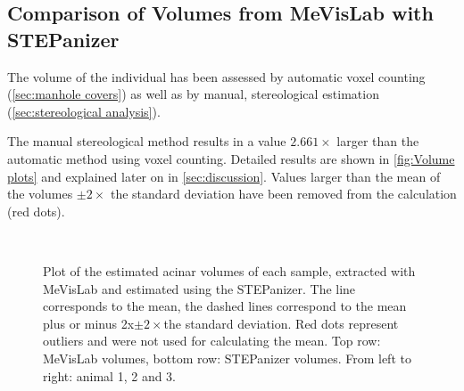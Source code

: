 \documentclass[a4paper,DIV=calc,abstract,english]{scrartcl}
\newcommand{\imsize}{\linewidth}
\newcommand{\biggerthan}{2} %
\newcommand{\difference}{2.661} %
\begin{document}
\subsection{Comparison of Volumes from MeVisLab with STEPanizer}
The volume of the individual has been assessed by automatic voxel counting (\autoref{sec:manhole covers}) as well as by manual, stereological estimation (\autoref{sec:stereological analysis}).

The manual stereological method results in a value \(\difference\times\) larger than the automatic method using voxel counting.
Detailed results are shown in \autoref{fig:Volume plots} and explained later on in \autoref{sec:discussion}.
Values larger than the mean of the volumes \(\pm\biggerthan\times\) the standard deviation have been removed from the calculation (red dots).

\renewcommand{\imsize}{0.35\textwidth}
\begin{figure}[htb]
	\centering
	\subfloat{
		}\hfill%
	\subfloat{
		
		}\hfill%
	\subfloat{
		
		}\\%
	\subfloat{
		
		}\hfill%
	\subfloat{
		
		}\hfill%
	\subfloat{
		
		}%
	\caption{Plot of the estimated acinar volumes of each sample, extracted with MeVisLab and estimated using the STEPanizer.
		The line corresponds to the mean, the dashed lines correspond to the mean \ifJCS plus or minus \biggerthan x\xspace\else\(\pm\biggerthan\times\)\xspace\fi the standard deviation.
		Red dots represent outliers and were not used for calculating the mean.
		Top row: MeVisLab volumes, bottom row: STEPanizer volumes.
		From left to right: animal 1, 2 and 3.}
	\label{fig:Volume plots}
\end{figure}
\end{document}
